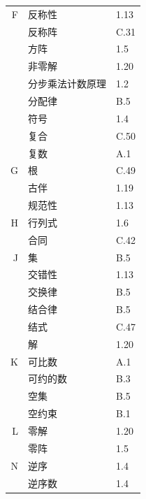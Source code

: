 \documentclass[../libro.tex]{subfiles}
\begin{document}
\begin{longtable}[c]{rll}
    F  & 反称性                      & 1.13 \\
    {} & 反称阵                      & C.31 \\
    {} & 方阵                       & 1.5  \\
    {} & 非零解                      & 1.20 \\
    {} & 分步乘法计数原理                 & 1.2  \\
    {} & 分配律                      & B.5  \\
    {} & 符号                       & 1.4  \\
    {} & 复合                       & C.50 \\
    {} & 复数                       & A.1  \\

    G  & 根                        & C.49 \\
    {} & 古伴                       & 1.19 \\
    {} & 规范性                      & 1.13 \\

    H  & 行列式                      & 1.6  \\
    {} & 合同                       & C.42 \\

    J  & 集                        & B.5  \\
    {} & 交错性                      & 1.13 \\
    {} & 交换律                      & B.5  \\
    {} & 结合律                      & B.5  \\
    {} & 结式                       & C.47 \\
    {} & 解                        & 1.20 \\

    K  & 可比数                      & A.1  \\
    {} & 可约的数                     & B.3  \\
    {} & 空集                       & B.5  \\
    {} & 空约束                      & B.1  \\

    L  & 零解                       & 1.20 \\
    {} & 零阵                       & 1.5  \\

    N  & 逆序                       & 1.4  \\
    {} & 逆序数                      & 1.4  \\


\end{longtable}
\end{document}

